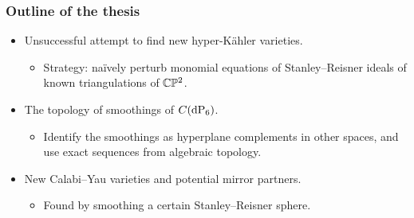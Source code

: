 \begin{frame}
\frametitle{Outline of the thesis}

\begin{itemize}
	\item Unsuccessful attempt to find new hyper-Kähler varieties.
	\begin{itemize}
		\item Strategy: naïvely perturb monomial equations of Stanley--Reisner ideals of known triangulations of $\mathbb{C} \mathbb{P}^2$.
	\end{itemize} \pause
	\item The topology of smoothings of $C(\dP6)$.
	\begin{itemize}
		\item Identify the smoothings as hyperplane complements in other spaces, and use exact sequences from algebraic topology.
	\end{itemize} \pause
	\item New Calabi--Yau varieties and potential mirror partners.
	\begin{itemize}
		\item Found by smoothing a certain Stanley--Reisner sphere.
	\end{itemize}
\end{itemize}

\end{frame}
